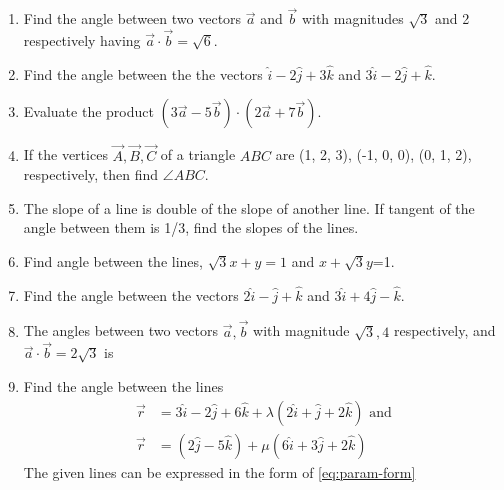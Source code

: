 \begin{enumerate}[label=\thesubsection.\arabic*, ref=\thesubsection.\theenumi]
\item Find the angle between two vectors $\overrightarrow{a}$ and $\overrightarrow {b} $ with magnitudes $\sqrt{3}$ and 2 respectively having $\overrightarrow {a}\cdot\overrightarrow {b}=\sqrt{6}$.
		\label{prob:12/10/3/1/inner}
	\\
	\solution
		
\item Find the angle between the the vectors $\hat{i}-2\hat{j}+3\hat{k}$ and $3\hat{i}-2\hat{j}+\hat{k}$.
	\\
	\solution
		
\item Evaluate the product $(3\overrightarrow {a}-5\overrightarrow {b})\cdot (2\overrightarrow {a}+7\overrightarrow {b})$.
	\\
	\solution
		
\item If the vertices $\vec{A}, \vec{B}, \vec{C}$ of a triangle $ABC$ are (1, 2, 3),  (-1, 0, 0),  (0, 1, 2),  respectively,  then find  $\angle{ABC}$.
	\\
	\solution
		
	\item The slope of a line is double of the slope of another line. If tangent of the angle between them is 1/3,  find the slopes of the lines.
\label{chapters/11/10/1/11}
\\
\solution 

\item    Find angle between the lines,  $\sqrt{3}x+y=1$ and $x+\sqrt{3}y$=1.
\label{chapters/11/10/3/9}
\\
   \solution 

\item Find the angle between the vectors $2\hat{i}-\hat{j}+\hat{k}$ and $3\hat{i}+4\hat{j}-\hat{k}$.
\item The angles between two vectors $\vec{a},  \vec{b}$ with magnitude $\sqrt{3},  4$ respectively,  and $\vec{a} \cdot \vec{b}= 2\sqrt{3}$ is
\item Find the angle between the lines 
\begin{align}
	\overrightarrow{r}&=3\hat{i}-2\hat{j}+6\hat{k}+\lambda(2\hat{i}+\hat{j}+2\hat{k})
	\text{ and}
	\\
	\overrightarrow{r}&=(2\hat{j}-5\hat{k})+\mu(6\hat{i}+3\hat{j}+2\hat{k})
\end{align}
%
\solution  The given lines can be expressed  in the form 
of 
	\eqref{eq:param-form}

\end{enumerate}
